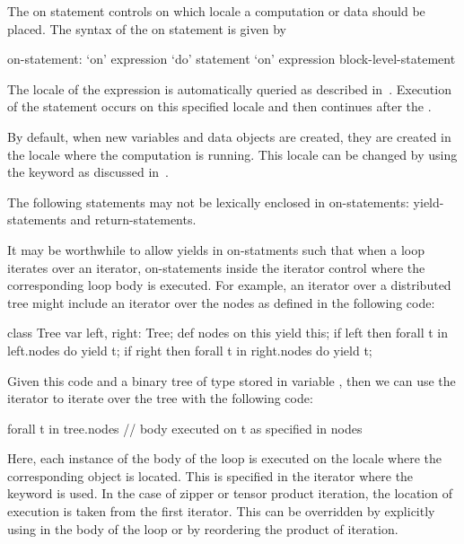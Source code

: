 The on statement controls on which locale a computation or data should
be placed.  The syntax of the on statement is given by
\begin{syntax}
on-statement:
  `on' expression `do' statement
  `on' expression block-level-statement
\end{syntax}
The locale of the expression is automatically queried as described
in~.  Execution of the
statement occurs on this specified locale and then continues after
the .

By default, when new variables and data objects are created, they are
created in the locale where the computation is running.  This locale
can be changed by using the  keyword as discussed
in~.

The following statements may not be lexically enclosed in
on-statements: yield-statements and return-statements.

\begin{openissue}
It may be worthwhile to allow yields in on-statments such that when a
loop iterates over an iterator, on-statements inside the iterator
control where the corresponding loop body is executed.  For example,
an iterator over a distributed tree might include an iterator over the
nodes as defined in the following code:
\begin{chapel}
class Tree {
  var left, right: Tree;
  def nodes {
    on this yield this;
    if left then
      forall t in left.nodes do
        yield t;
    if right then
      forall t in right.nodes do
        yield t;
  }
}
\end{chapel}
Given this code and a binary tree of type  stored in
variable , then we can use the  iterator to
iterate over the tree with the following code:
\begin{chapel}
forall t in tree.nodes {
  // body executed on t as specified in nodes
}
\end{chapel}
Here, each instance of the body of the  loop is executed
on the locale where the corresponding object  is located.
This is specified in the  iterator where the 
keyword is used.  In the case of zipper or tensor product iteration,
the location of execution is taken from the first iterator.  This can
be overridden by explicitly using  in the body of the loop or
by reordering the product of iteration.
\end{openissue}

